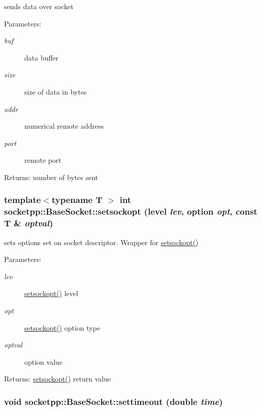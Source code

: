 sends data over socket 

\begin{Desc}
\item[Parameters:]
\begin{description}
\item[{\em buf}]data buffer \item[{\em size}]size of data in bytes \item[{\em addr}]numerical remote address \item[{\em port}]remote port \end{description}
\end{Desc}
\begin{Desc}
\item[Returns:]number of bytes sent \end{Desc}
\hypertarget{classsocketpp_1_1BaseSocket_3f1f168e4953c046bb1159941da2fa30}{
\subsubsection[{setsockopt}]{\setlength{\rightskip}{0pt plus 5cm}template$<$typename T $>$ int socketpp::BaseSocket::setsockopt ({\bf level} {\em lev}, \/  {\bf option} {\em opt}, \/  const T \& {\em optval})}}
\label{classsocketpp_1_1BaseSocket_3f1f168e4953c046bb1159941da2fa30}


sets options set on socket descriptor. Wrapper for \hyperlink{classsocketpp_1_1BaseSocket_3f1f168e4953c046bb1159941da2fa30}{setsockopt()} 

\begin{Desc}
\item[Parameters:]
\begin{description}
\item[{\em lev}]\hyperlink{classsocketpp_1_1BaseSocket_3f1f168e4953c046bb1159941da2fa30}{setsockopt()} level \item[{\em opt}]\hyperlink{classsocketpp_1_1BaseSocket_3f1f168e4953c046bb1159941da2fa30}{setsockopt()} option type \item[{\em optval}]option value \end{description}
\end{Desc}
\begin{Desc}
\item[Returns:]\hyperlink{classsocketpp_1_1BaseSocket_3f1f168e4953c046bb1159941da2fa30}{setsockopt()} return value \end{Desc}
\hypertarget{classsocketpp_1_1BaseSocket_0804d148470fd742cda495d3533b25c6}{
\subsubsection[{settimeout}]{\setlength{\rightskip}{0pt plus 5cm}void socketpp::BaseSocket::settimeout (double {\em time})}}
\label{classsocketpp_1_1BaseSocket_0804d148470fd742cda495d3533b25c6}


